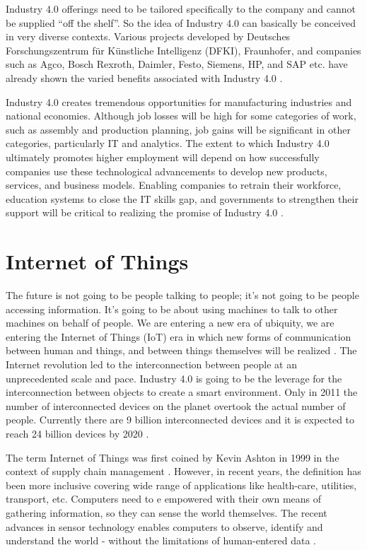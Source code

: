 Industry 4.0 offerings need to be tailored specifically to the company and cannot be supplied “off the shelf”. So the idea of Industry 4.0 can basically be conceived in very diverse contexts. Various projects developed by Deutsches Forschungszentrum für Künstliche Intelligenz (DFKI), Fraunhofer, and companies such as Agco, Bosch Rexroth, Daimler, Festo, Siemens, HP, and SAP etc. have already shown the varied benefits associated with Industry 4.0 \cite{DBHENG}. 

Industry 4.0 creates tremendous opportunities for manufacturing industries and national economies. Although job losses will be high for some categories of work, such as assembly and production planning, job gains will be significant in other categories, particularly \acs{IT} and analytics. The extent to which Industry 4.0 ultimately promotes higher employment will depend on how successfully companies use these technological advancements to develop new products, services, and business models. Enabling companies to retrain their workforce, education systems to close the \acs{IT} skills gap, and governments to strengthen their support will be critical to realizing the promise of Industry 4.0 \cite{MANMACHINE,INDUSINTERNET}.
\section{Internet of Things} \label{IOT}
The future is not going to be people talking to people; it's not going to be people accessing information. It's going to be about using machines to talk to other machines on behalf of people. We are entering a new era of ubiquity, we are entering the Internet of Things (\acs{IoT}) era in which new forms of communication between human and things, and between things themselves will be realized \cite{IOTFUTURE}. The Internet revolution led to the interconnection between people at an unprecedented scale and pace. Industry 4.0 is going to be the leverage for the interconnection between objects to create a smart environment. Only in 2011 the number of interconnected devices on the planet overtook the actual number of people. Currently there are 9 billion interconnected devices and it is expected to reach 24 billion devices by 2020 \cite{IOTGUBBI}.

The term Internet of Things was first coined by Kevin Ashton in 1999 in the context of supply chain management \cite{IOTFIRST}. However, in recent years, the definition has been more inclusive covering wide range of applications like health-care, utilities, transport, etc. Computers need to e empowered with their own means of gathering information, so they can sense the world themselves. The recent advances in sensor technology enables computers to observe, identify and understand the world - without the limitations of human-entered data \cite{IOTFIRST}.

